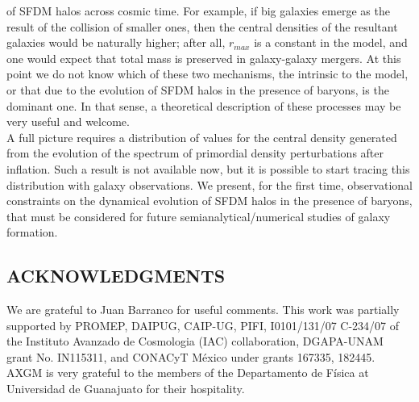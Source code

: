 \documentclass{article}
\begin{document}
\begin{multicols}{2}[]
of SFDM halos across cosmic time. For example, if big
galaxies emerge as the result of the collision of smaller
ones, then the central densities of the resultant galaxies
would be naturally higher; after all, $r_{max}$ is a constant
in the model, and one would expect that total mass is
preserved in galaxy-galaxy mergers. At this point we do
not know which of these two mechanisms, the intrinsic to
the model, or that due to the evolution of SFDM halos
in the presence of baryons, is the dominant one. In that
sense, a theoretical description of these processes may be
very useful and welcome.
\\A full picture requires a distribution of values for the
central density generated from the evolution of the spectrum of primordial density perturbations after inflation.
Such a result is not available now, but it is possible to
start tracing this distribution with galaxy observations.
We present, for the first time, observational constraints
on the dynamical evolution of SFDM halos in the presence of baryons, that must be considered for future semianalytical/numerical studies of galaxy formation.
\begin{center}
\section*{\normalsize{ACKNOWLEDGMENTS}}
\end{center}
We are grateful to Juan Barranco for useful comments.
This work was partially supported by PROMEP, DAIPUG, CAIP-UG, PIFI, I0101/131/07 C-234/07 of the Instituto Avanzado de Cosmologia (IAC) collaboration,
DGAPA-UNAM grant No. IN115311, and CONACyT
México under grants 167335, 182445. AXGM is very
grateful to the members of the Departamento de Física
at Universidad de Guanajuato for their hospitality.

\medskip
\printbibliography




\end{multicols}
\end{document}
